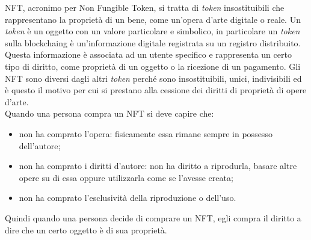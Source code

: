 \gls{NFT}, acronimo per Non Fungible Token, si tratta di \textit{token} insostituibili che rappresentano la proprietà di un bene, come un'opera d'arte digitale o reale. Un \textit{token} è un oggetto con un valore particolare e simbolico, in particolare un \textit{token} sulla \gls{blockchaing} è un'informazione digitale registrata su un registro distribuito. Questa informazione è associata ad un utente specifico e rappresenta un certo tipo di diritto, come proprietà di un oggetto o la ricezione di un pagamento. Gli \gls{NFT} sono diversi dagli altri \textit{token} perché sono insostituibili, unici, indivisibili ed è questo il motivo per cui si prestano alla cessione dei diritti di proprietà di opere d'arte.\\
Quando una persona compra un \gls{NFT} si deve capire che:
\begin{itemize}
	\item non ha comprato l'opera: fisicamente essa rimane sempre in possesso dell'autore;
	\item non ha comprato i diritti d'autore: non ha diritto a riprodurla, basare altre opere su di essa oppure utilizzarla come se l'avesse creata;
	\item non ha comprato l'esclusività della riproduzione o dell'uso.
\end{itemize}
Quindi quando una persona decide di comprare un \gls{NFT}, egli compra il diritto a dire che un certo oggetto è di sua proprietà.

